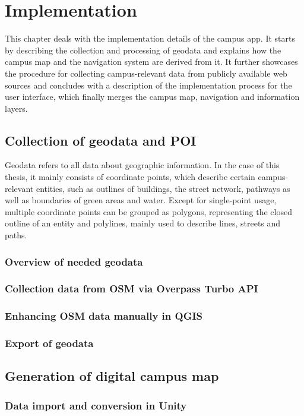 \chapter{Implementation}
This chapter deals with the implementation details of the campus app. It starts by describing the collection and processing of geodata and explains how the campus map and the navigation system are derived from it. It further showcases the procedure for collecting campus-relevant data from publicly available web sources and concludes with a description of the implementation process for the user interface, which finally merges the campus map, navigation and information layers.

\label{cha:implementation}
\section{Collection of geodata and POI}
Geodata refers to all data about geographic information. In the case of this thesis, it mainly consists of coordinate points, which describe certain campus-relevant entities, such as outlines of buildings, the street network, pathways as well as boundaries of green areas and water. Except for single-point usage, multiple coordinate points can be grouped as polygons, representing the closed outline of an entity and polylines, mainly used to describe lines, streets and paths.

\subsection{Overview of needed geodata}
\subsection{Collection data from OSM via Overpass Turbo API}
\subsection{Enhancing OSM data manually in QGIS}
\subsection{Export of geodata}

\section{Generation of digital campus map}
\subsection{Data import and conversion in Unity}
